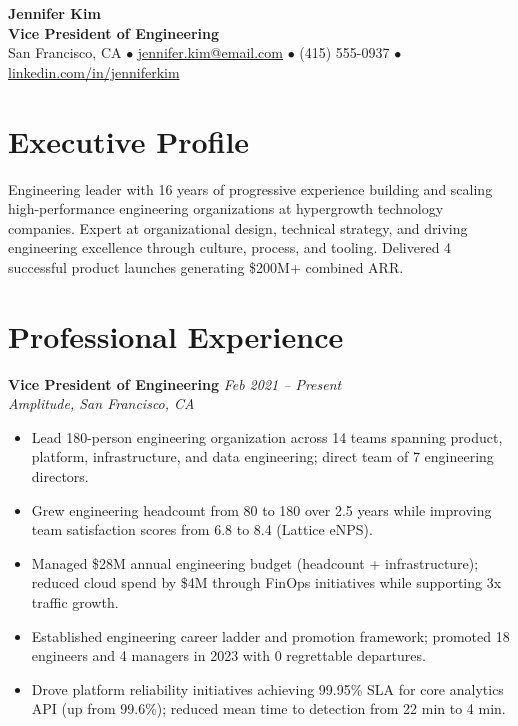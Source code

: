 \documentclass[11pt,a4paper]{article}
\begin{document}
\begin{center}
  {\LARGE \textbf{Jennifer Kim}}\\[4pt]
  \textbf{Vice President of Engineering}\\[3pt]
  San Francisco, CA \quad$\bullet$\quad
  \href{mailto:jennifer.kim@email.com}{jennifer.kim@email.com} \quad$\bullet$\quad
  (415) 555-0937 \quad$\bullet$\quad
  \href{https://linkedin.com/in/jenniferkim}{linkedin.com/in/jenniferkim}
\end{center}

\section{Executive Profile}
Engineering leader with 16 years of progressive experience building and scaling high-performance engineering organizations at hypergrowth technology companies. Expert at organizational design, technical strategy, and driving engineering excellence through culture, process, and tooling. Delivered 4 successful product launches generating \$200M+ combined ARR.

\section{Professional Experience}

\noindent\textbf{Vice President of Engineering} \hfill \textit{Feb 2021 -- Present}\\
\textit{Amplitude, San Francisco, CA}
\begin{itemize}
  \item Lead 180-person engineering organization across 14 teams spanning product, platform, infrastructure, and data engineering; direct team of 7 engineering directors.
  \item Grew engineering headcount from 80 to 180 over 2.5 years while improving team satisfaction scores from 6.8 to 8.4 (Lattice eNPS).
  \item Managed \$28M annual engineering budget (headcount + infrastructure); reduced cloud spend by \$4M through FinOps initiatives while supporting 3x traffic growth.
  \item Established engineering career ladder and promotion framework; promoted 18 engineers and 4 managers in 2023 with 0 regrettable departures.
  \item Drove platform reliability initiatives achieving 99.95\% SLA for core analytics API (up from 99.6\%); reduced mean time to detection from 22 min to 4 min.
\end{itemize}
\end{document}

